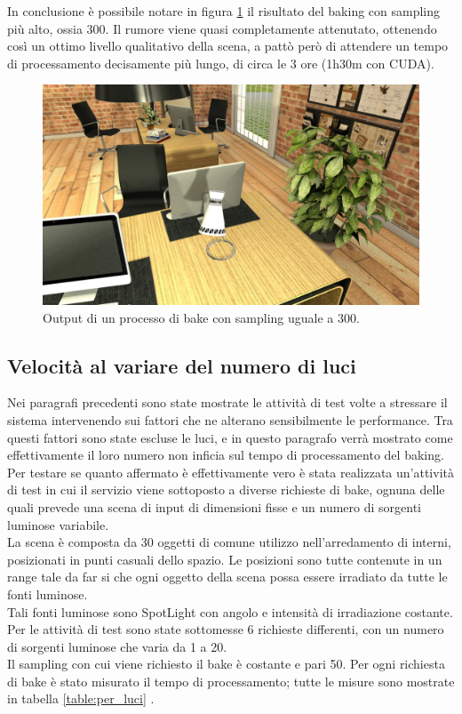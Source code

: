 In conclusione è possibile notare in figura \ref{fig:sampl300} il risultato del baking con sampling più alto, ossia 300. Il rumore viene quasi completamente attenutato, ottenendo così un ottimo livello qualitativo della scena, a pattò però di attendere un tempo di processamento decisamente più lungo, di circa le 3 ore (1h30m con CUDA).
\\
\begin{figure}[htb]
 \centering
 \includegraphics[width=0.8\linewidth]{images/chapter_prove_sperimentali/sampl300.png}\hfill
 \caption[Output sampling 300]{Output di un processo di bake con sampling uguale a 300.}
 \label{fig:sampl300}
\end{figure}

\subsection{Velocità al variare del numero di luci}
\label{sec:chapter_prove_sperimentali_servizio_baking_vel_luci}

Nei paragrafi precedenti sono state mostrate le attività di test volte a stressare il sistema intervenendo sui fattori che ne alterano sensibilmente le performance. Tra questi fattori sono state escluse le luci, e in questo paragrafo verrà mostrato come effettivamente il loro numero non inficia sul tempo di processamento del baking.
\\
Per testare se quanto affermato è effettivamente vero è stata realizzata un’attività di test in cui il servizio viene sottoposto a diverse richieste di bake, ognuna delle quali prevede una scena di input di dimensioni fisse e un numero di sorgenti luminose variabile. 
\\
La scena è composta da 30 oggetti di comune utilizzo nell’arredamento di interni, posizionati in punti casuali dello spazio. Le posizioni sono tutte contenute in un range tale da far si che ogni oggetto della scena possa essere irradiato da tutte le fonti luminose. 
\\
Tali fonti  luminose sono SpotLight con angolo e intensità di irradiazione costante. Per le attività di test sono state sottomesse 6 richieste differenti, con un numero di sorgenti luminose che varia da 1 a 20.
\\
Il sampling con cui viene richiesto il bake è costante e pari 50. 
Per ogni richiesta di bake è stato misurato il tempo di processamento; tutte le misure sono mostrate in tabella \ref{table:per_luci} .

